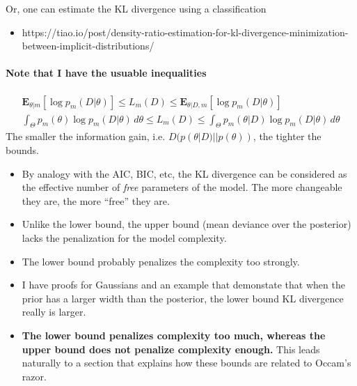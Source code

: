 \documentclass[10pt,a4paper]{article}
\begin{document}
Or, one can estimate the KL divergence using a classification
\begin{itemize}
\item https://tiao.io/post/density-ratio-estimation-for-kl-divergence-minimization-between-implicit-distributions/
\end{itemize}

\paragraph{Note that I have the usuable inequalities}
\begin{align}
\mathbf{E}_{\theta|m} \left[  \log p_m(D|\theta)  \right ]  \leq L_m(D) \leq  \mathbf{E}_{\theta|D,m} \left[ \log p_m(D|\theta) \right ] \\
\int_\Theta p_m(\theta) \log  p_m(D|\theta) \, d\theta   \leq L_m(D) \leq \int_\Theta p_m(\theta|D) \log  p_m(D|\theta) \, d\theta 
\end{align}
The smaller the information gain, i.e. $D( p(\theta |D) || p(\theta))$, the tighter the bounds. 
\begin{itemize}
\item By analogy with the AIC, BIC, etc, the KL divergence can be considered as the effective number of \emph{free} parameters of the model. The more changeable they are, the more ``free'' they are. 
\item Unlike the lower bound, the upper bound (mean deviance over the posterior) lacks the penalization for the model complexity.
\item The lower bound probably penalizes the complexity too strongly.
\item I have proofs for Gaussians and an example that demonstate that when the prior has a larger width than the posterior, the lower bound KL divergence really is larger.
\item {\textbf{The lower bound penalizes complexity too much, whereas the upper bound does not penalize complexity enough.}} This leads naturally to a section that explains how these bounds are related to Occam's razor.
\end{itemize}
\end{document}
